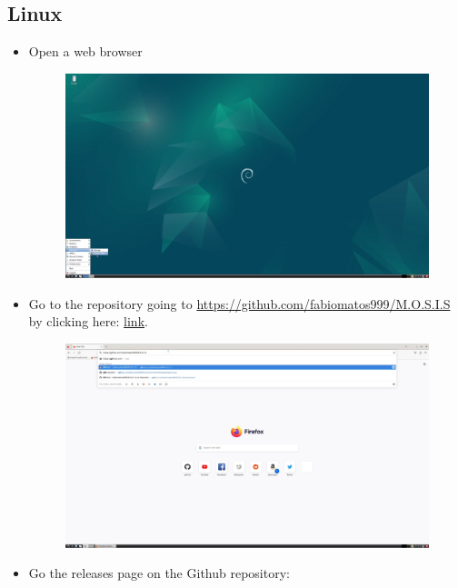 \documentclass[12pt]{article}
\begin{document}
\begin{center}
	\subsection{Linux}
	\begin{itemize}
		\item Open a web browser
		      \begin{figure}[H]
			      \includegraphics[width=\textwidth]{Figures/Linux-Open-Web-Browser.png}
		      \end{figure}
		\item Go to the repository going to \href{https://github.com/fabiomatos999/M.O.S.I.S}{https://github.com/fabiomatos999/M.O.S.I.S} by clicking here: \href{https://github.com/fabiomatos999/M.O.S.I.S}{link}.
		      \begin{figure}[H]
			      \includegraphics[width=\textwidth]{Figures/Linux-Go-To-Repo.png}
		      \end{figure}
		\item Go the releases page on the Github repository:
		      \begin{figure}[H]

\end{figure}
\end{itemize}
\end{center}
\end{document}
